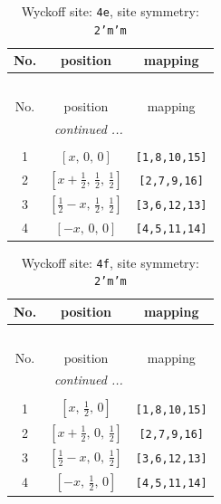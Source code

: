 \documentclass[fleqn,8pt]{jsarticle}
\begin{document}
\begin{longtable}{ccc}
\caption{Wyckoff site: {\tt 4e}, site symmetry: {\tt 2'm'm}}
 \\
 \hline \hline
No. & position & mapping \\ \hline \endfirsthead

\multicolumn{2}{l}{\tablename\ \thetable{}} \\
 \hline \hline
No. & position & mapping \\ \hline \endhead

 \hline \hline
\multicolumn{2}{r}{\footnotesize\it continued ...} \\ \endfoot

 \hline \hline
\multicolumn{2}{r}{} \\ \endlastfoot

1 & $\left[ x,\, 0,\, 0 \right]$ & {\tt [1,8,10,15]} \\ \hline
2 & $\left[ x + \frac{1}{2},\, \frac{1}{2},\, \frac{1}{2} \right]$ & {\tt [2,7,9,16]} \\ \hline
3 & $\left[ \frac{1}{2} - x,\, \frac{1}{2},\, \frac{1}{2} \right]$ & {\tt [3,6,12,13]} \\ \hline
4 & $\left[ - x,\, 0,\, 0 \right]$ & {\tt [4,5,11,14]} \\
\end{longtable}
\renewcommand{\arraystretch}{1.2}
\begin{longtable}{ccc}
\caption{Wyckoff site: {\tt 4f}, site symmetry: {\tt 2'm'm}}
 \\
 \hline \hline
No. & position & mapping \\ \hline \endfirsthead

\multicolumn{2}{l}{\tablename\ \thetable{}} \\
 \hline \hline
No. & position & mapping \\ \hline \endhead

 \hline \hline
\multicolumn{2}{r}{\footnotesize\it continued ...} \\ \endfoot

 \hline \hline
\multicolumn{2}{r}{} \\ \endlastfoot

1 & $\left[ x,\, \frac{1}{2},\, 0 \right]$ & {\tt [1,8,10,15]} \\ \hline
2 & $\left[ x + \frac{1}{2},\, 0,\, \frac{1}{2} \right]$ & {\tt [2,7,9,16]} \\ \hline
3 & $\left[ \frac{1}{2} - x,\, 0,\, \frac{1}{2} \right]$ & {\tt [3,6,12,13]} \\ \hline
4 & $\left[ - x,\, \frac{1}{2},\, 0 \right]$ & {\tt [4,5,11,14]} \\
\end{longtable}
\end{document}
